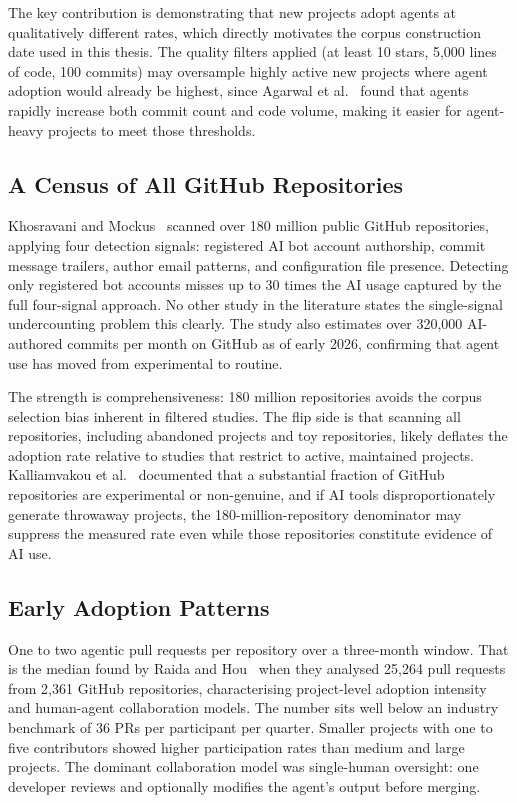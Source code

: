 The key contribution is demonstrating that new projects adopt agents at qualitatively different rates, which directly motivates the corpus construction date used in this thesis. The quality filters applied (at least 10 stars, 5,000 lines of code, 100 commits) may oversample highly active new projects where agent adoption would already be highest, since Agarwal et al.~\cite{agarwal2026} found that agents rapidly increase both commit count and code volume, making it easier for agent-heavy projects to meet those thresholds.

\subsection{A Census of All GitHub Repositories}

Khosravani and Mockus~\cite{khosravani2026} scanned over 180 million public GitHub repositories, applying four detection signals: registered AI bot account authorship, commit message trailers, author email patterns, and configuration file presence. Detecting only registered bot accounts misses up to 30 times the AI usage captured by the full four-signal approach. No other study in the literature states the single-signal undercounting problem this clearly. The study also estimates over 320,000 AI-authored commits per month on GitHub as of early 2026, confirming that agent use has moved from experimental to routine.

The strength is comprehensiveness: 180 million repositories avoids the corpus selection bias inherent in filtered studies. The flip side is that scanning all repositories, including abandoned projects and toy repositories, likely deflates the adoption rate relative to studies that restrict to active, maintained projects. Kalliamvakou et al.~\cite{kalliamvakou2016} documented that a substantial fraction of GitHub repositories are experimental or non-genuine, and if AI tools disproportionately generate throwaway projects, the 180-million-repository denominator may suppress the measured rate even while those repositories constitute evidence of AI use.

\subsection{Early Adoption Patterns}

One to two agentic pull requests per repository over a three-month window. That is the median found by Raida and Hou~\cite{raida2026} when they analysed 25,264 pull requests from 2,361 GitHub repositories, characterising project-level adoption intensity and human-agent collaboration models. The number sits well below an industry benchmark of 36 PRs per participant per quarter. Smaller projects with one to five contributors showed higher participation rates than medium and large projects. The dominant collaboration model was single-human oversight: one developer reviews and optionally modifies the agent's output before merging.


